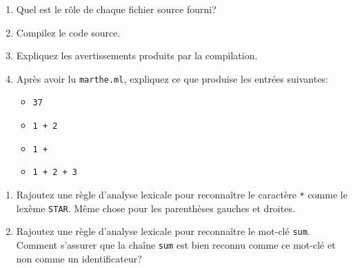 \documentclass{article}
\begin{document}
\begin{exercise}
  \-
  \begin{enumerate}
  \item
    Quel est le rôle de chaque fichier source fourni?

  \item
    Compilez le code source.

  \item
    Expliquez les avertissements produits par la compilation.

  \item
    Après avoir lu \verb!marthe.ml!, expliquez ce que produise les entrées
    suivantes:
    \begin{itemize}
    \item \verb!37!
    \item \verb!1 + 2!
    \item \verb!1 +!
    \item \verb!1 + 2 + 3!
    \end{itemize}
  \end{enumerate}
\end{exercise}

\begin{exercise}
  \-
  \begin{enumerate}
  \item
    Rajoutez une règle d'analyse lexicale pour reconnaître le
    caractère \verb!*!  comme le lexème \verb!STAR!. Même chose pour
    les parenthèses gauches et droites.

  \item
    Rajoutez une règle d'analyse lexicale pour reconnaître le mot-clé
    \verb!sum!.  Comment s'assurer que la chaîne \verb!sum! est bien reconnu
    comme ce mot-clé et non comme un identificateur?
  \end{enumerate}
\end{exercise}
\end{document}
